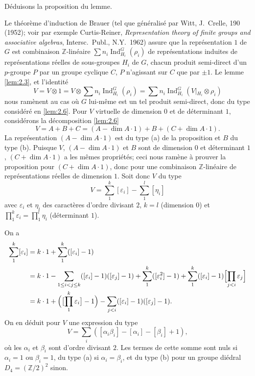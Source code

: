 \documentclass[11pt]{amsart}
\theoremstyle{plain}
\theoremstyle{definition}
\DeclareMathOperator{\Ind}{Ind}
\newcommand{\Z}{\mathbb{Z}}
\begin{document}
D\'eduisons la proposition du lemme.

Le th\'eor\`eme d'induction de Brauer (tel que g\'en\'eralis\'e par Witt, J.~Crelle, 190 (1952); voir par exemple Curtis-Reiner, \textit{Representation theory of finite groups and associative algebras}, Intersc.~Publ., N.Y.~1962) assure que la repr\'esentation $1$ de $G$ est combinaison $\Z$-lin\'eaire $\sum n_i\Ind_{H_i}^G(\rho_i)$ de repr\'esentations induites de repr\'esentations r\'eelles de sous-groupes $H_i$ de $G$, chacun produit semi-direct d'un $p$-groupe $P$ par un groupe cyclique $C$, $P$ n'agissant sur $C$ que par $\pm1$. Le lemme \ref{lem:2.3}, et l'identit\'e
\[
V=V\otimes 1=V\otimes\sum n_i\Ind_{H_i}^G(\rho_i)=\sum n_i\Ind_{H_i}^G(V|\!_{H_i}\otimes\rho_i)
\]
nous ram\`enent au cas o\`u $G$ lui-m\^eme est un tel produit semi-direct, donc du type consid\'er\'e en \ref{lem:2.6}. Pour $V$ virtuelle de dimension $0$ et de d\'eterminant $1$, consid\'erons la d\'ecomposition \ref{lem:2.6}
\[
V=A+B+C=(A-\dim A\cdot 1)+B+(C+\dim A\cdot 1).
\]
La repr\'esentation $(A-\dim A\cdot 1)$ est du type (a) de la proposition et $B$ du type (b). Puisque $V$, $(A-\dim A\cdot 1)$ et $B$ sont de dimension $0$ et d\'eterminant $1$, $(C+\dim A\cdot 1)$ a les m\^emes propri\'et\'es; ceci nous ram\`ene \`a prouver la proposition pour $(C+\dim A\cdot 1)$, donc pour une combinaison $\Z$-lin\'eaire de repr\'esentations r\'eelles de dimension $1$. Soit donc $V$ du type
\[
V=\sum_1^k[\varepsilon_i]-\sum_1^l[\eta_i]
\]
avec $\varepsilon_i$ et $\eta_i$ des caract\`eres d'ordre divisant $2$, $k=l$ (dimension $0$) et $\prod_1^k\varepsilon_i=\prod_1^l\eta_i$ (d\'eterminant $1$).

On a
\begin{align*}
\sum_1^k[\varepsilon_i] &= k\cdot 1+\sum_1^k([\varepsilon_i]-1) \\
&= k\cdot 1-\sum_{1\le i<j\le k}([\varepsilon_i]-1)([\varepsilon_j]-1)+\sum_1^k([\varepsilon_i^2]-1)+\sum_1^k([\varepsilon_i]-1)\Bigl[\prod_{j<i}\varepsilon_j\Bigr] \\
&= k\cdot 1+\Bigl(\bigl[\prod_1^k\varepsilon_i\bigr]-1\Bigr)-\sum_{j<i}([\varepsilon_i]-1)([\varepsilon_j]-1).
\end{align*}
On en d\'eduit pour $V$ une expression du type
\[
V=\sum_i([\alpha_i\beta_i]-[\alpha_i]-[\beta_i]+1),
\]
o\`u les $\alpha_i$ et $\beta_i$ sont d'ordre divisant $2$. Les termes de cette somme sont nuls si $\alpha_i=1$ ou $\beta_i=1$, du type (a) si $\alpha_i=\beta_i$, et du type (b) pour un groupe di\'edral $D_4=(\Z/2)^2$ sinon.
\end{document}

